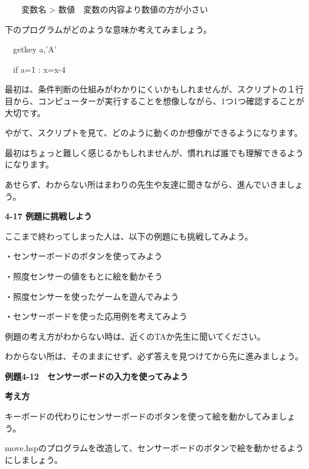 \documentclass[a4paper,dvipdfmx]{jarticle}
\newcommand\textstyleqwerty[1]{#1}
\begin{document}
\ \ \ \ 変数名 {\textgreater}
数値\ \ 変数の内容より数値の方が小さい



\bigskip

下のプログラムがどのような意味か考えてみましょう。


\bigskip

\ \ getkey a,’A’

\ \ if a=1 : x=x-4


\bigskip

最初は、条件判断の仕組みがわかりにくいかもしれませんが、スクリプトの１行目から、コンピューターが実行することを想像しながら、1つ1つ確認することが大切です。

やがて、スクリプトを見て、どのように動くのか想像ができるようになります。

最初はちょっと難しく感じるかもしれませんが、慣れれば誰でも理解できるようになります。

あせらず、わからない所はまわりの先生や友達に聞きながら、進んでいきましょう。


\bigskip


\bigskip

{\bfseries
4-17 例題に挑戦しよう}


\bigskip

ここまで終わってしまった人は、以下の例題にも挑戦してみよう。


\bigskip

・センサーボードのボタンを使ってみよう

・照度センサーの値をもとに絵を動かそう

・照度センサーを使ったゲームを遊んでみよう

・センサーボードを使った応用例を考えてみよう


\bigskip

例題の考え方がわからない時は、近くのTAか先生に聞いてください。

わからない所は、そのままにせず、必ず答えを見つけてから先に進みましょう。


\bigskip

\clearpage
\textstyleqwerty{\textbf{例題4-12　センサーボードの入力を使ってみよう}}


\bigskip

{\bfseries
考え方}


\bigskip

キーボードの代わりにセンサーボードのボタンを使って絵を動かしてみましょう。

move.hspのプログラムを改造して、センサーボードのボタンで絵を動かせるようにしましょう。
\end{document}
